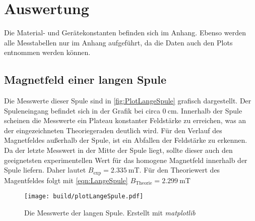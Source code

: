 \section{Auswertung}
\label{sec:Auswertung}
Die Material- und Gerätekonstanten befinden sich im Anhang. Ebenso werden alle Messtabellen nur im Anhang aufgeführt, da die Daten auch den Plots entnommen werden können.
\subsection{Magnetfeld einer langen Spule}
\label{subsec:A_langeSpule}
Die Messwerte dieser Spule sind in \autoref{fig:PlotLangeSpule} grafisch dargestellt. Der Spuleneingang befindet sich in der Grafik bei circa $0 \: \unit{\centi\metre}$.
Innerhalb der Spule scheinen die Messwerte ein Plateau konstanter Feldstärke zu erreichen, was an der eingezeichneten Theoriegeraden deutlich wird. 
Für den Verlauf des Magnetfeldes außerhalb der Spule, ist ein Abfallen der Feldstärke zu erkennen. Da der letzte Messwert in der Mitte der Spule liegt, sollte dieser auch den geeignetsten experimentellen Wert
für das homogene Magnetfeld innerhalb der Spule liefern. Daher lautet $B_{\text{exp}} = 2.335\:\unit{\milli\tesla}$. 
Für den Theoriewert des Magentfeldes folgt mit \autoref{eqn:LangeSpule} $B_{\text{Theorie}} = 2.299\:\unit{\milli\tesla}$
\begin{figure}
    \centering
    \caption{Die Messwerte der langen Spule. Erstellt mit \textit{matplotlib} \cite{matplotlib}}
    \label{fig:PlotLangeSpule}
    \texttt{[image: build/plotLangeSpule.pdf]}
\end{figure}
